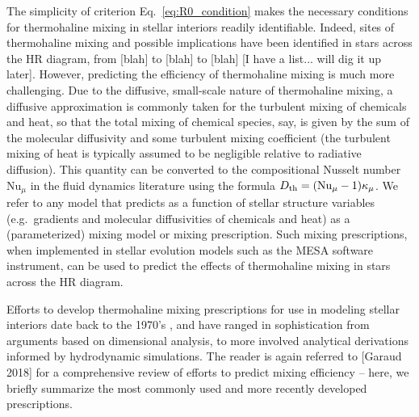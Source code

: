 The simplicity of criterion Eq.~\eqref{eq:R0_condition} makes the necessary conditions for thermohaline mixing in stellar interiors readily identifiable. 
Indeed, sites of thermohaline mixing and possible implications have been identified in stars across the HR diagram, from [blah] to [blah] to [blah] [I have a list... will dig it up later]. 
However, predicting the efficiency of thermohaline mixing is much more challenging. 
Due to the diffusive, small-scale nature of thermohaline mixing, a diffusive approximation is commonly taken for the turbulent mixing of chemicals and heat, so that the total mixing of chemical species, say, is given by the sum of the molecular diffusivity and some turbulent mixing coefficient \Dth (the turbulent mixing of heat is typically assumed to be negligible relative to radiative diffusion). 
This quantity can be converted to the compositional Nusselt number $\mathrm{Nu}_{\mu}$ in the fluid dynamics literature using the formula $D_\mathrm{th} = (\mathrm{Nu}_{\mu} - 1)\kappa_\mu$. 
We refer to any model that predicts \Dth as a function of stellar structure variables (e.g.~gradients and molecular diffusivities of chemicals and heat) as a (parameterized) mixing model or mixing prescription. 
Such mixing prescriptions, when implemented in stellar evolution models such as the MESA software instrument, can be used to predict the effects of thermohaline mixing in stars across the HR diagram.

Efforts to develop thermohaline mixing prescriptions for use in modeling stellar interiors date back to the 1970's \citep{ulrich_1972}, and have ranged in sophistication from arguments based on dimensional analysis, to more involved analytical derivations informed by hydrodynamic simulations. 
The reader is again referred to [Garaud 2018] for a comprehensive review of efforts to predict mixing efficiency -- here, we briefly summarize the most commonly used and more recently developed prescriptions.



